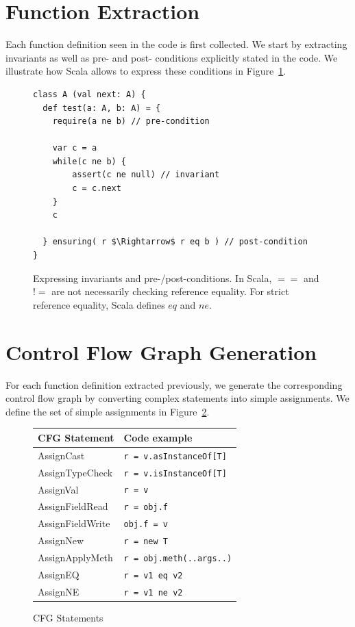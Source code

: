 \section{Function Extraction}
Each function definition seen in the code is first collected. We start by
extracting invariants as well as pre- and post- conditions explicitly stated in
the code. We illustrate how Scala allows to express these conditions in
Figure~\ref{fig:fe:example1}.

\begin{figure}[h]
    \centering
\begin{lstlisting}
class A (val next: A) {
  def test(a: A, b: A) = {
    require(a ne b) // pre-condition

    var c = a
    while(c ne b) {
        assert(c ne null) // invariant
        c = c.next
    }
    c

  } ensuring( r $\Rightarrow$ r eq b ) // post-condition
}
\end{lstlisting}
    \caption{Expressing invariants and pre-/post-conditions. In Scala, $==$ and
    $!=$ are not necessarily checking reference equality. For strict
    reference equality, Scala defines $eq$ and $ne$.}
    \label{fig:fe:example1}
\end{figure}

\section{Control Flow Graph Generation}
For each function definition extracted previously, we generate the
corresponding control flow graph by converting complex statements into simple
assignments. We define the set of simple assignments in
Figure~\ref{fig:cfg:statements}.

\FloatBarrier
\begin{figure}[h]
    \centering

    \begin{tabular}{ l | l }
        CFG Statement               & Code example \\
        \hline
        AssignCast       & \verb/r = v.asInstanceOf[T]/  \\
        AssignTypeCheck  & \verb/r = v.isInstanceOf[T]/  \\
        AssignVal        & \verb/r = v/  \\
        AssignFieldRead  & \verb/r = obj.f/  \\
        AssignFieldWrite & \verb/obj.f = v/  \\
        AssignNew        & \verb/r = new T/  \\
        AssignApplyMeth  & \verb/r = obj.meth(..args..)/  \\
        AssignEQ         & \verb/r = v1 eq v2/  \\
        AssignNE         & \verb/r = v1 ne v2/  \\
    \end{tabular}

    \caption{CFG Statements}
    \label{fig:cfg:statements}
\end{figure}

